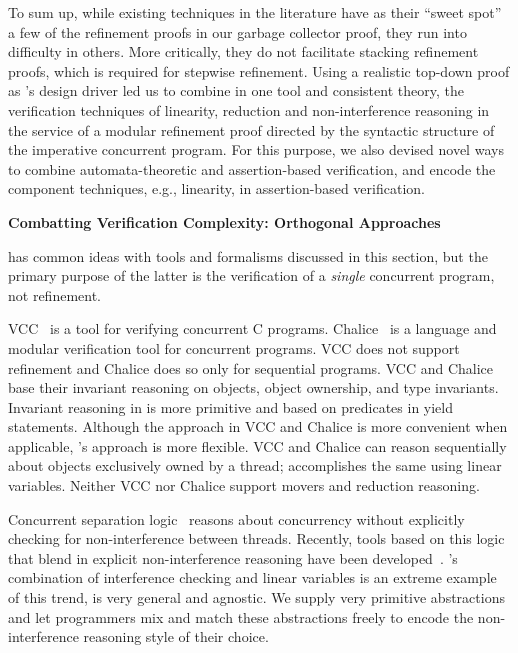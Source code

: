 To sum up, while existing techniques in the literature have as their
``sweet spot'' a few of the refinement proofs in our garbage collector
proof, they run into difficulty in others. 
More critically, they
do not facilitate stacking refinement proofs, which is required for stepwise
refinement. 
Using a realistic top-down proof as \civl's design driver led us to
combine in one tool and consistent theory, the verification techniques
of linearity, reduction and non-interference reasoning in the service
of a modular refinement proof directed by the syntactic structure of
the imperative concurrent program. 
For this purpose, we also devised
novel ways to combine automata-theoretic and assertion-based
verification, and encode the component techniques, e.g., linearity, in
assertion-based verification. 

{\bf Combatting Verification Complexity: Orthogonal Approaches} 

\civl has common ideas with tools and formalisms
discussed in this section, but the primary purpose of the latter 
is the verification of a {\em single} concurrent program, not refinement. 

VCC~\cite{VCC} is a tool for verifying concurrent C programs.  
Chalice~\cite{LM09} is a language and modular verification tool for concurrent programs. 
VCC does not support refinement and Chalice does so only for sequential programs.  
VCC and Chalice base their invariant reasoning on objects, object ownership, and type invariants. 
Invariant reasoning in \civl is more primitive and based on predicates in yield statements. 
Although the approach in VCC and Chalice is more convenient when applicable, \civl's approach is more flexible. 
VCC and Chalice can reason sequentially about objects exclusively owned by a thread;
\civl accomplishes the same using linear variables.
Neither VCC nor Chalice support movers and reduction reasoning.

Concurrent separation logic~\cite{OHearn07} reasons about concurrency without 
explicitly checking for non-interference between threads. 
Recently, tools based on this logic that blend in explicit non-interference reasoning have been developed~\cite{SAGL,RGSep}. 
\civl's combination of interference checking and linear variables is
an extreme example of this trend, is very general and agnostic. We supply very primitive abstractions and let programmers mix and
match these abstractions freely to encode the non-interference
reasoning style of their choice. 
